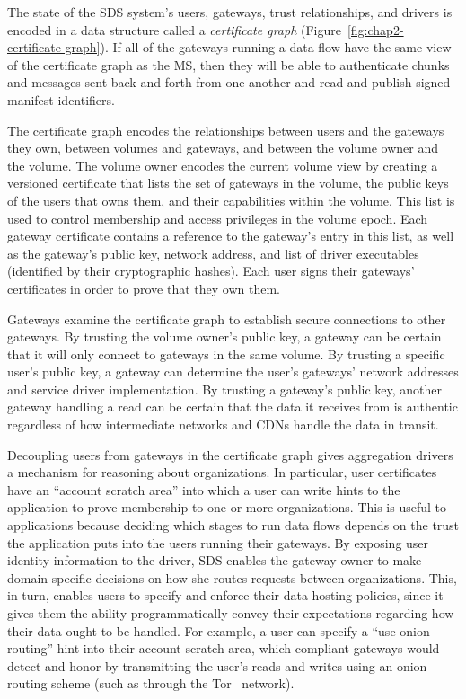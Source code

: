 The state of the SDS system's users, gateways, trust relationships, and drivers
is encoded in a data structure called a \emph{certificate graph}
(Figure~\ref{fig:chap2-certificate-graph}).  If all
of the gateways running a data flow have the same view of the certificate graph
as the MS, then they will be able to authenticate chunks and messages sent back and forth from one another
and read and publish signed manifest identifiers.

The certificate graph encodes the relationships between users and the gateways
they own, between volumes and gateways, and between the volume owner and the volume.
The volume owner encodes the current volume view by creating a versioned certificate that lists the set of gateways
in the volume, the public keys of the users that owns them, and their capabilities within the
volume.  This list is used to control membership and access
privileges in the volume epoch.  Each gateway certificate contains a reference to the gateway's
entry in this list, as well as the gateway's public key, network address, and list of
driver executables (identified by their cryptographic hashes).  Each user signs
their gateways' certificates in order to prove that they own them.

Gateways examine the certificate graph to establish secure connections to other
gateways.  By trusting the volume owner's public key, a gateway can be certain that it will
only connect to gateways in the same volume.  By trusting a specific user's
public key, a gateway can determine the user's gateways' network addresses and
service driver implementation.  By trusting a gateway's public key, another gateway
handling a read can be certain that the data it receives from is authentic regardless of how
intermediate networks and CDNs handle the data in transit.

Decoupling users from gateways in the certificate graph gives aggregation
drivers a mechanism for reasoning about organizations.  In particular, user
certificates have an ``account scratch area'' into which a user can write hints to the
application to prove membership to one or more organizations.  This is useful
to applications because deciding which
stages to run data flows depends on the trust the application
puts into the users running their gateways.  By exposing user identity
information to the driver, SDS enables the gateway owner to make domain-specific
decisions on how she routes requests between organizations.  This, in turn,
enables users to specify and enforce their data-hosting policies, since it gives
them the ability programmatically convey their expectations regarding how their
data ought to be handled.  For example, a user
can specify a ``use onion routing'' hint into their account scratch area, which
compliant gateways would detect and honor by transmitting the user's reads and writes using
an onion routing scheme (such as through the Tor~\cite{tor} network).

